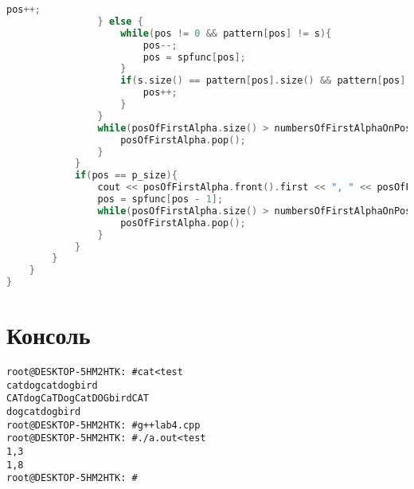 \begin{lstlisting}[language=C]
                    pos++;
                } else {
                    while(pos != 0 && pattern[pos] != s){
                        pos--;
                        pos = spfunc[pos];
                    }
                    if(s.size() == pattern[pos].size() && pattern[pos] == s){
                        pos++;
                    }
                }
                while(posOfFirstAlpha.size() > numbersOfFirstAlphaOnPos[pos]){
                    posOfFirstAlpha.pop();
                }
            }
            if(pos == p_size){
                cout << posOfFirstAlpha.front().first << ", " << posOfFirstAlpha.front().second  << '\n';
                pos = spfunc[pos - 1];
                while(posOfFirstAlpha.size() > numbersOfFirstAlphaOnPos[pos]){
                    posOfFirstAlpha.pop();
                }
            }
        }
    }
}
\end{lstlisting}


\section{Консоль}
\begin{alltt}
root@DESKTOP-5HM2HTK:~# cat <test
cat dog cat dog bird
CAT dog CaT Dog Cat DOG bird CAT
dog cat dog bird
root@DESKTOP-5HM2HTK:~# g++ lab4.cpp
root@DESKTOP-5HM2HTK:~# ./a.out <test
1, 3
1, 8
root@DESKTOP-5HM2HTK:~#
\end{alltt}
\pagebreak

